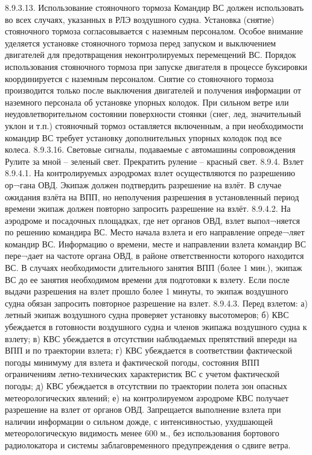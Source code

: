 8.9.3.13.	Использование стояночного тормоза 
Командир ВС должен использовать во всех случаях, указанных в РЛЭ воздушного судна. Установка (снятие) стояночного тормоза согласовывается с наземным персоналом. 
Особое внимание уделяется установке стояночного тормоза перед запуском и выключением двигателей для предотвращения неконтролируемых перемещений ВС. Порядок использования стояночного тормоза при запуске двигателя в процессе буксировки координируется с наземным персоналом. 
Снятие со стояночного тормоза производится только после выключения двигателей и получения информации от наземного персонала об установке упорных колодок. 
При сильном ветре или неудовлетворительном состоянии поверхности стоянки (снег, лед, значительный уклон и т.п.) стояночный тормоз оставляется включенным, а при необходимости командир ВС требует установку дополнительных упорных колодок под все колеса. 
 8.9.3.16.	Световые сигналы, подаваемые с автомашины сопровождения
Рулите за мной – зеленый свет.
Прекратить руление – красный свет.
8.9.4.	Взлет
8.9.4.1. На контролируемых аэродромах взлет осуществляются по разрешению ор¬гана ОВД. Экипаж должен подтвердить разрешение на взлёт. В случае ожидания взлёта на ВПП, но неполучения разрешения в установленный период времени экипаж должен повторно запросить разрешение на взлёт.
8.9.4.2. На аэродроме и посадочных площадках, где нет органов ОВД, взлет выпол¬няется по решению командира ВС. Место начала взлета и его направление опреде¬ляет командир ВС. Информацию о времени, месте 
и направлении взлета командир ВС пере¬дает на частоте органа ОВД, в районе ответственности которого находится ВС. В случаях необходимости длительного занятия ВПП (более 1 мин.), экипаж ВС до ее занятия необходимом времени для подготовки к взлету. Если после выдачи разрешения на взлет прошло более 1 минуты, то экипаж воздушного судна обязан запросить повторное разрешение на взлет.
8.9.4.3. Перед взлетом: 
а)	летный экипаж воздушного судна проверяет установку высотомеров; 
б)	КВС убеждается в готовности воздушного судна и членов экипажа воздушного судна к взлету; 
в)	КВС убеждается в отсутствии наблюдаемых препятствий впереди на ВПП и по траектории взлета; 
г)	КВС убеждается в соответствии фактической погоды минимуму для взлета и фактической погоды, состояния ВПП ограничениям летно-технических характеристик ВС с учетом фактической погоды; 
д)	КВС убеждается в отсутствии по траектории полета зон опасных метеорологических явлений; 
е)	на контролируемом аэродроме КВС получает разрешение на взлет от органов ОВД. 
Запрещается выполнение взлета при наличии информации о сильном дожде, с интенсивностью, ухудшающей метеорологическую видимость менее 600 м., без использования бортового радиолокатора и системы заблаговременного предупреждения о сдвиге ветра. 
